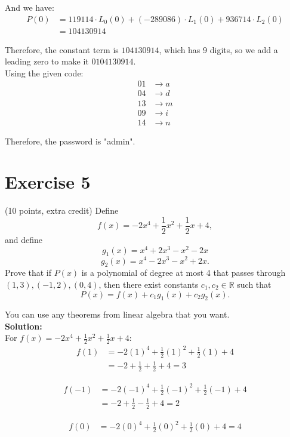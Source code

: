 \documentclass{article}
\begin{document}
And we have:
\begin{align*}
P(0) &= 119114 \cdot L_0(0) + (-289086) \cdot L_1(0) + 936714 \cdot L_2(0) \\
&= 104130914
\end{align*}

Therefore, the constant term is $104130914$, which has 9 digits, so we add a leading zero to make it $0104130914$. \\

Using the given code:
\begin{align*}
01 &\rightarrow a\\
04 &\rightarrow d\\
13 &\rightarrow m\\
09 &\rightarrow i\\
14 &\rightarrow n
\end{align*}

Therefore, the password is "admin".

\newpage

\section*{Exercise 5}
(10 points, extra credit) Define
\[
f(x) = -2x^4 + \frac{1}{2}x^2 + \frac{1}{2}x + 4,
\]
and define
\[
g_1(x) = x^4 + 2x^3 - x^2 - 2x
\]
\[
g_2(x) = x^4 - 2x^3 - x^2 + 2x.
\]
Prove that if $P(x)$ is a polynomial of degree at most 4 that passes through $(1,3), (-1,2), (0,4)$, then there exist constants $c_1, c_2 \in \mathbb{R}$ such that
\[
P(x) = f(x) + c_1 g_1(x) + c_2 g_2(x).
\]

You can use any theorems from linear algebra that you want. \\

\textbf{Solution:} \\

For $f(x) = -2x^4 + \frac{1}{2}x^2 + \frac{1}{2}x + 4$:
\begin{align*}
f(1) &= -2(1)^4 + \frac{1}{2}(1)^2 + \frac{1}{2}(1) + 4 \\
&= -2 + \frac{1}{2} + \frac{1}{2} + 4 = 3
\end{align*}

\begin{align*}
f(-1) &= -2(-1)^4 + \frac{1}{2}(-1)^2 + \frac{1}{2}(-1) + 4 \\
&= -2 + \frac{1}{2} - \frac{1}{2} + 4 = 2
\end{align*}

\begin{align*}
f(0) &= -2(0)^4 + \frac{1}{2}(0)^2 + \frac{1}{2}(0) + 4 = 4
\end{align*}
\end{document}

